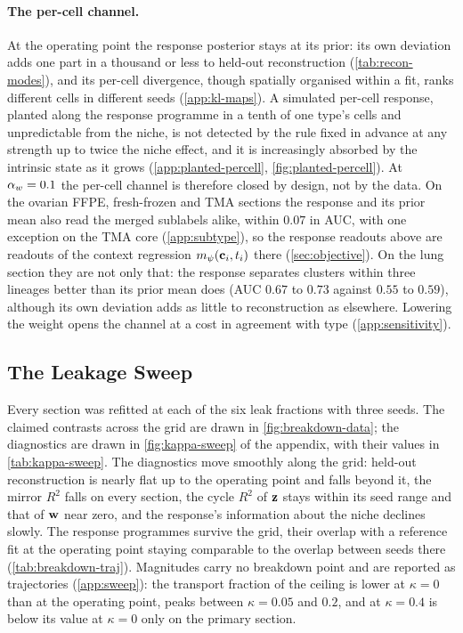 \paragraph{The per-cell channel.}
 At the operating point the response posterior stays at its prior: its own deviation adds one part in a thousand or less to held-out reconstruction (\cref{tab:recon-modes}), and its per-cell divergence, though spatially organised within a fit, ranks different cells in different seeds (\cref{app:kl-maps}). A simulated per-cell response, planted along the response programme in a tenth of one type's cells and unpredictable from the niche, is not detected by the rule fixed in advance at any strength up to twice the niche effect, and it is increasingly absorbed by the intrinsic state as it grows (\cref{app:planted-percell}, \cref{fig:planted-percell}). At $\alpha_w = 0.1$ the per-cell channel is therefore closed by design, not by the data. On the ovarian FFPE, fresh-frozen and TMA sections the response and its prior mean also read the merged sublabels alike, within $0.07$ in AUC, with one exception on the TMA core (\cref{app:subtype}), so the response readouts above are readouts of the context regression $m_{\psi}(\mathbf{c}_i, t_i)$ there (\cref{sec:objective}). On the lung section they are not only that: the response separates clusters within three lineages better than its prior mean does (AUC $0.67$ to $0.73$ against $0.55$ to $0.59$), although its own deviation adds as little to reconstruction as elsewhere. Lowering the weight opens the channel at a cost in agreement with type (\cref{app:sensitivity}).

\subsection{The Leakage Sweep}
\label{sec:results-sweep}

Every section was refitted at each of the six leak fractions with three seeds. The claimed contrasts across the grid are drawn in \cref{fig:breakdown-data}; the diagnostics are drawn in \cref{fig:kappa-sweep} of the appendix, with their values in \cref{tab:kappa-sweep}. The diagnostics move smoothly along the grid: held-out reconstruction is nearly flat up to the operating point and falls beyond it, the mirror $R^2$ falls on every section, the cycle $R^2$ of $\mathbf{z}$ stays within its seed range and that of $\mathbf{w}$ near zero, and the response's information about the niche declines slowly. The response programmes survive the grid, their overlap with a reference fit at the operating point staying comparable to the overlap between seeds there (\cref{tab:breakdown-traj}). Magnitudes carry no breakdown point and are reported as trajectories (\cref{app:sweep}): the transport fraction of the ceiling is lower at $\kappa = 0$ than at the operating point, peaks between $\kappa = 0.05$ and $0.2$, and at $\kappa = 0.4$ is below its value at $\kappa = 0$ only on the primary section.

